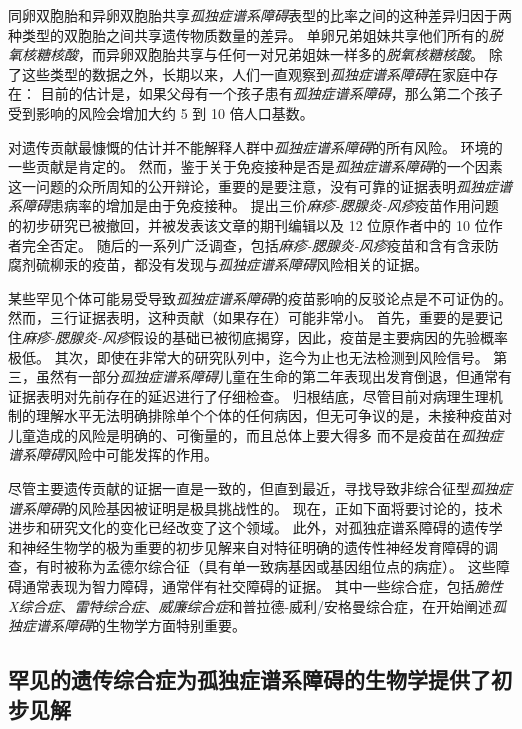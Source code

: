 同卵双胞胎和异卵双胞胎共享\textit{孤独症谱系障碍}表型的比率之间的这种差异归因于两种类型的双胞胎之间共享遗传物质数量的差异。
单卵兄弟姐妹共享他们所有的\textit{脱氧核糖核酸}，而异卵双胞胎共享与任何一对兄弟姐妹一样多的\textit{脱氧核糖核酸}。
除了这些类型的数据之外，长期以来，人们一直观察到\textit{孤独症谱系障碍}在家庭中存在：
目前的估计是，如果父母有一个孩子患有\textit{孤独症谱系障碍}，那么第二个孩子受到影响的风险会增加大约 5 到 10 倍人口基数。


对遗传贡献最慷慨的估计并不能解释人群中\textit{孤独症谱系障碍}的所有风险。
环境的一些贡献是肯定的。
然而，鉴于关于免疫接种是否是\textit{孤独症谱系障碍}的一个因素这一问题的众所周知的公开辩论，重要的是要注意，没有可靠的证据表明\textit{孤独症谱系障碍}患病率的增加是由于免疫接种。
提出三价\textit{麻疹-腮腺炎-风疹}疫苗作用问题的初步研究已被撤回，并被发表该文章的期刊编辑以及 12 位原作者中的 10 位作者完全否定。
随后的一系列广泛调查，包括\textit{麻疹-腮腺炎-风疹}疫苗和含有含汞防腐剂硫柳汞的疫苗，都没有发现与\textit{孤独症谱系障碍}风险相关的证据。


某些罕见个体可能易受导致\textit{孤独症谱系障碍}的疫苗影响的反驳论点是不可证伪的。
然而，三行证据表明，这种贡献（如果存在）可能非常小。
首先，重要的是要记住\textit{麻疹-腮腺炎-风疹}假设的基础已被彻底揭穿，因此，疫苗是主要病因的先验概率极低。
其次，即使在非常大的研究队列中，迄今为止也无法检测到风险信号。
第三，虽然有一部分\textit{孤独症谱系障碍}儿童在生命的第二年表现出发育倒退，但通常有证据表明对先前存在的延迟进行了仔细检查。
归根结底，尽管目前对病理生理机制的理解水平无法明确排除单个个体的任何病因，但无可争议的是，未接种疫苗对儿童造成的风险是明确的、可衡量的，而且总体上要大得多 而不是疫苗在\textit{孤独症谱系障碍}风险中可能发挥的作用。


尽管主要遗传贡献的证据一直是一致的，但直到最近，寻找导致非综合征型\textit{孤独症谱系障碍}的风险基因被证明是极具挑战性的。
现在，正如下面将要讨论的，技术进步和研究文化的变化已经改变了这个领域。
此外，对孤独症谱系障碍的遗传学和神经生物学的极为重要的初步见解来自对特征明确的遗传性神经发育障碍的调查，有时被称为孟德尔综合征（具有单一致病基因或基因组位点的病症）。
这些障碍通常表现为智力障碍，通常伴有社交障碍的证据。
其中一些综合症，包括\textit{脆性X综合症}、\textit{雷特综合症}、\textit{威廉综合症}和普拉德-威利/安格曼综合症，在开始阐述\textit{孤独症谱系障碍}的生物学方面特别重要。



\subsection{罕见的遗传综合症为孤独症谱系障碍的生物学提供了初步见解}


